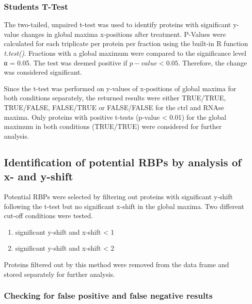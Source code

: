 \documentclass[
]{article}
\begin{document}
\hypertarget{students-t-test}{%
\subsubsection{Students T-Test}\label{students-t-test}}

The two-tailed, unpaired t-test was used to identify proteins with
significant y-value changes in global maxima x-positions after
treatment. P-Values were calculated for each triplicate per protein per
fraction using the built-in R function \emph{t.test()}. Fractions with a
global maximum were compared to the significance level α = 0.05. The
test was deemed positive if \(p-value < 0.05\). Therefore, the change
was considered significant.

Since the t-test was performed on y-values of x-positions of global
maxima for both conditions separately, the returned results were either
TRUE/TRUE, TRUE/FALSE, FALSE/TRUE or FALSE/FALSE for the ctrl and RNAse
maxima. Only proteins with positive t-tests (p-value \textless{} 0.01)
for the global maximum in both conditions (TRUE/TRUE) were considered
for further analysis.

\hypertarget{identification-of-potential-rbps-by-analysis-of-x--and-y-shift}{%
\subsection{Identification of potential RBPs by analysis of x- and
y-shift}\label{identification-of-potential-rbps-by-analysis-of-x--and-y-shift}}

Potential RBPs were selected by filtering out proteins with significant
y-shift following the t-test but no significant x-shift in the global
maxima. Two different cut-off conditions were tested.

\begin{enumerate}
\def\labelenumi{\arabic{enumi}.}
\item
  significant y-shift and x-shift \textless{} 1
\item
  significant y-shift and x-shift \textless{} 2
\end{enumerate}

Proteins filtered out by this method were removed from the data frame
and stored separately for further analysis.

\hypertarget{checking-for-false-positive-and-false-negative-results}{%
\subsubsection{Checking for false positive and false negative
results}\label{checking-for-false-positive-and-false-negative-results}}
\end{document}
